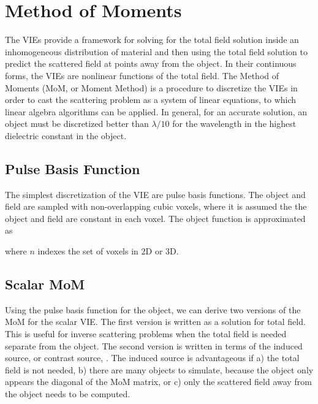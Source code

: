 {\footnotesize
{}
}

\clearpage
\newpage


\section{Method of Moments}

The VIEs provide a framework for solving for the total field solution inside an inhomogeneous distribution of material and then using the total field solution to predict the scattered field at points away from the object. In their continuous forms, the VIEs are nonlinear functions of the total field. The Method of Moments (MoM, or Moment Method) is a procedure to discretize the VIEs in order to cast the scattering problem as a system of linear equations, to which linear algebra algorithms can be applied. In general, for an accurate solution, an object must be discretized better than $\lambda/10$ for the wavelength in the highest dielectric constant in the object. 

\subsection{Pulse Basis Function}
The simplest discretization of the VIE are pulse basis functions. The object and field are sampled with non-overlapping cubic voxels, where it is assumed the the object and field are constant in each voxel. The object function is approximated as 

\noindent where $n$ indexes the set of voxels in 2D or 3D.  

\subsection{Scalar MoM} 

Using the pulse basis function for the object, we can derive two versions of the MoM for the scalar VIE. The first version is written as a solution for total field. This is useful for inverse scattering problems when the total field is needed separate from the object.  The second version is written in terms of the induced source, or contrast source, \cite{van1997contrast}. The induced source is advantageous if a) the total field is not needed, b) there are many objects to simulate, because  the object only appears the diagonal of the MoM matrix, or c) only the scattered field away from the object needs to be computed.

